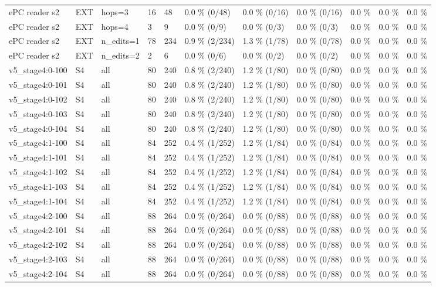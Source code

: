 \documentclass[10pt,a4paper]{article}
\begin{document}
\begin{center}
\begin{tabularx}{\textwidth}{@{}p{}XXXXXXXXXX@{}}
ePC reader s2 & EXT & hops=3 & 16 & 48 & 0.0 \% (0/48) & 0.0 \% (0/16) & 0.0 \% (0/16) & 0.0 \% & 0.0 \% & 0.0 \% \\
ePC reader s2 & EXT & hops=4 & 3 & 9 & 0.0 \% (0/9) & 0.0 \% (0/3) & 0.0 \% (0/3) & 0.0 \% & 0.0 \% & 0.0 \% \\
ePC reader s2 & EXT & n\_edits=1 & 78 & 234 & 0.9 \% (2/234) & 1.3 \% (1/78) & 0.0 \% (0/78) & 0.0 \% & 0.0 \% & 0.0 \% \\
ePC reader s2 & EXT & n\_edits=2 & 2 & 6 & 0.0 \% (0/6) & 0.0 \% (0/2) & 0.0 \% (0/2) & 0.0 \% & 0.0 \% & 0.0 \% \\
v5\_stage4:0-100 & S4 & all & 80 & 240 & 0.8 \% (2/240) & 1.2 \% (1/80) & 0.0 \% (0/80) & 0.0 \% & 0.0 \% & 0.0 \% \\
v5\_stage4:0-101 & S4 & all & 80 & 240 & 0.8 \% (2/240) & 1.2 \% (1/80) & 0.0 \% (0/80) & 0.0 \% & 0.0 \% & 0.0 \% \\
v5\_stage4:0-102 & S4 & all & 80 & 240 & 0.8 \% (2/240) & 1.2 \% (1/80) & 0.0 \% (0/80) & 0.0 \% & 0.0 \% & 0.0 \% \\
v5\_stage4:0-103 & S4 & all & 80 & 240 & 0.8 \% (2/240) & 1.2 \% (1/80) & 0.0 \% (0/80) & 0.0 \% & 0.0 \% & 0.0 \% \\
v5\_stage4:0-104 & S4 & all & 80 & 240 & 0.8 \% (2/240) & 1.2 \% (1/80) & 0.0 \% (0/80) & 0.0 \% & 0.0 \% & 0.0 \% \\
v5\_stage4:1-100 & S4 & all & 84 & 252 & 0.4 \% (1/252) & 1.2 \% (1/84) & 0.0 \% (0/84) & 0.0 \% & 0.0 \% & 0.0 \% \\
v5\_stage4:1-101 & S4 & all & 84 & 252 & 0.4 \% (1/252) & 1.2 \% (1/84) & 0.0 \% (0/84) & 0.0 \% & 0.0 \% & 0.0 \% \\
v5\_stage4:1-102 & S4 & all & 84 & 252 & 0.4 \% (1/252) & 1.2 \% (1/84) & 0.0 \% (0/84) & 0.0 \% & 0.0 \% & 0.0 \% \\
v5\_stage4:1-103 & S4 & all & 84 & 252 & 0.4 \% (1/252) & 1.2 \% (1/84) & 0.0 \% (0/84) & 0.0 \% & 0.0 \% & 0.0 \% \\
v5\_stage4:1-104 & S4 & all & 84 & 252 & 0.4 \% (1/252) & 1.2 \% (1/84) & 0.0 \% (0/84) & 0.0 \% & 0.0 \% & 0.0 \% \\
v5\_stage4:2-100 & S4 & all & 88 & 264 & 0.0 \% (0/264) & 0.0 \% (0/88) & 0.0 \% (0/88) & 0.0 \% & 0.0 \% & 0.0 \% \\
v5\_stage4:2-101 & S4 & all & 88 & 264 & 0.0 \% (0/264) & 0.0 \% (0/88) & 0.0 \% (0/88) & 0.0 \% & 0.0 \% & 0.0 \% \\
v5\_stage4:2-102 & S4 & all & 88 & 264 & 0.0 \% (0/264) & 0.0 \% (0/88) & 0.0 \% (0/88) & 0.0 \% & 0.0 \% & 0.0 \% \\
v5\_stage4:2-103 & S4 & all & 88 & 264 & 0.0 \% (0/264) & 0.0 \% (0/88) & 0.0 \% (0/88) & 0.0 \% & 0.0 \% & 0.0 \% \\
v5\_stage4:2-104 & S4 & all & 88 & 264 & 0.0 \% (0/264) & 0.0 \% (0/88) & 0.0 \% (0/88) & 0.0 \% & 0.0 \% & 0.0 \% \\
\bottomrule
\end{tabularx}
\end{center}
\end{document}
